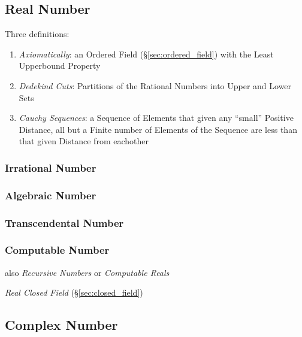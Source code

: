 \subsection{Real Number}\label{sec:real_number}

Three definitions:
\begin{enumerate}
  \item \emph{Axiomatically}: an Ordered Field
    (\S\ref{sec:ordered_field}) with the Least Upperbound Property
  \item \emph{Dedekind Cuts}: Partitions of the Rational Numbers into
    Upper and Lower Sets
  \item \emph{Cauchy Sequences}: a Sequence of Elements that given any
    ``small'' Positive Distance, all but a Finite number of Elements
    of the Sequence are less than that given Distance from eachother
\end{enumerate}

\subsubsection{Irrational Number}\label{sec:irrational}

\subsubsection{Algebraic Number}\label{sec:algebraic_number}

\subsubsection{Transcendental Number}\label{sec:transcendental}

\subsubsection{Computable Number}\label{sec:computable_real}

also \emph{Recursive Numbers} or \emph{Computable Reals}

\emph{Real Closed Field} (\S\ref{sec:closed_field})



\subsection{Complex Number}\label{sec:complex_number}


